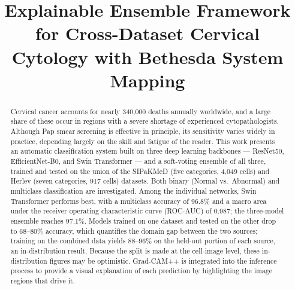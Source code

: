 \documentclass[conference]{IEEEtran}
\begin{document}
\title{Explainable Ensemble Framework for Cross-Dataset Cervical Cytology with Bethesda System Mapping}

\author{
}

\maketitle

\begin{abstract}
Cervical cancer accounts for nearly 340,000 deaths annually worldwide, and a large share of these occur in regions with a severe shortage of experienced cytopathologists. Although Pap smear screening is effective in principle, its sensitivity varies widely in practice, depending largely on the skill and fatigue of the reader. This work presents an automatic classification system built on three deep learning backbones --- ResNet50, EfficientNet-B0, and Swin Transformer --- and a soft-voting ensemble of all three, trained and tested on the union of the SIPaKMeD (five categories, 4,049 cells) and Herlev (seven categories, 917 cells) datasets. Both binary (Normal vs.\ Abnormal) and multiclass classification are investigated. Among the individual networks, Swin Transformer performs best, with a multiclass accuracy of 96.8\% and a macro area under the receiver operating characteristic curve (ROC-AUC) of 0.987; the three-model ensemble reaches 97.1\%. Models trained on one dataset and tested on the other drop to 68--80\% accuracy, which quantifies the domain gap between the two sources; training on the combined data yields 88--96\% on the held-out portion of each source, an in-distribution result. Because the split is made at the cell-image level, these in-distribution figures may be optimistic. Grad-CAM++ is integrated into the inference process to provide a visual explanation of each prediction by highlighting the image regions that drive it.
\end{abstract}
\end{document}
